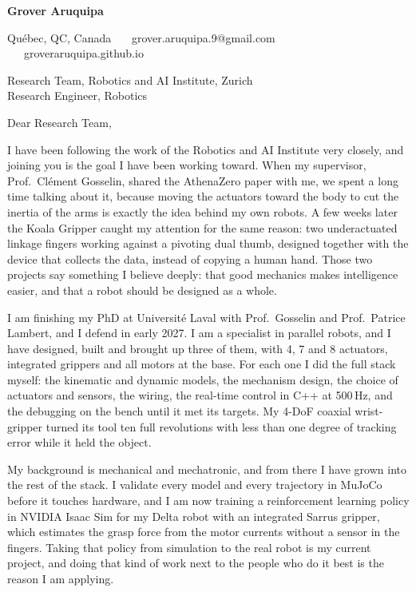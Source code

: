 \documentclass[11pt,a4paper]{article}
\begin{document}
{\large\bfseries Grover Aruquipa}\par\vspace{-6pt}
{\small Qu\'ebec, QC, Canada \ \textbullet\ \ grover.aruquipa.9@gmail.com \ \textbullet\ \ groveraruquipa.github.io}

\vspace{4pt}
Research Team, Robotics and AI Institute, Zurich\\
Research Engineer, Robotics

Dear Research Team,

I have been following the work of the Robotics and AI Institute very closely, and joining you is the goal I have been working toward. When my supervisor, Prof.\ Cl\'ement Gosselin, shared the AthenaZero paper with me, we spent a long time talking about it, because moving the actuators toward the body to cut the inertia of the arms is exactly the idea behind my own robots. A few weeks later the Koala Gripper caught my attention for the same reason: two underactuated linkage fingers working against a pivoting dual thumb, designed together with the device that collects the data, instead of copying a human hand. Those two projects say something I believe deeply: that good mechanics makes intelligence easier, and that a robot should be designed as a whole.

I am finishing my PhD at Universit\'e Laval with Prof.\ Gosselin and Prof.\ Patrice Lambert, and I defend in early 2027. I am a specialist in parallel robots, and I have designed, built and brought up three of them, with 4, 7 and 8 actuators, integrated grippers and all motors at the base. For each one I did the full stack myself: the kinematic and dynamic models, the mechanism design, the choice of actuators and sensors, the wiring, the real-time control in C++ at 500\,Hz, and the debugging on the bench until it met its targets. My 4-DoF coaxial wrist-gripper turned its tool ten full revolutions with less than one degree of tracking error while it held the object.

My background is mechanical and mechatronic, and from there I have grown into the rest of the stack. I validate every model and every trajectory in MuJoCo before it touches hardware, and I am now training a reinforcement learning policy in NVIDIA Isaac Sim for my Delta robot with an integrated Sarrus gripper, which estimates the grasp force from the motor currents without a sensor in the fingers. Taking that policy from simulation to the real robot is my current project, and doing that kind of work next to the people who do it best is the reason I am applying.
\end{document}
